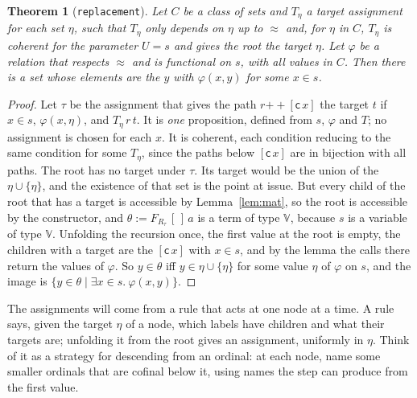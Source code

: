 \documentclass[10pt]{article}
\newtheorem{theorem}{Theorem}[section]
\theoremstyle{definition}
\theoremstyle{remark}
\newcommand{\V}{\mathbb{V}}
\newcommand{\lc}{\mathsf{c}}
\newcommand{\lean}[1]{\texttt{#1}}
\begin{document}
\begin{theorem}[\lean{replacement}]\label{thm:repl}
Let $C$ be a class of sets and $T_\eta$ a target assignment for each set
$\eta$, such that $T_\eta$ only depends on $\eta$ up to $\approx$ and, for $\eta$ in $C$,
$T_\eta$ is coherent for the parameter $U=s$ and gives the root the
target $\eta$. Let $\varphi$ be a relation that respects $\approx$ and is functional
on $s$, with all values in $C$. Then there is a set whose elements are
the $y$ with $\varphi(x,y)$ for some $x\in s$.
\end{theorem}
\begin{proof}
Let $\tau$ be the assignment that gives the path $r\mathbin{+\!\!+}[\lc\,x]$ the
target $t$ if $x\in s$, $\varphi(x,\eta)$, and $T_\eta\,r\,t$. It is \emph{one}
proposition, defined from $s$, $\varphi$ and $T$; no assignment is chosen for
each $x$. It is coherent, each condition reducing to the same condition
for some $T_\eta$, since the paths below $[\lc\,x]$ are in bijection with all
paths. The root has no target under $\tau$. Its target would be the union
of the $\eta\cup\{\eta\}$, and the existence of that set is the point at
issue. But every child of the root that has a target is accessible by
Lemma~\ref{lem:mat}, so the root is accessible by the constructor, and
$\theta:=F_{R_\tau}\,[\,]\,a$ is a term of type $\V$, because $s$ is a
variable of type $\V$. Unfolding the recursion once, the first value at
the root is empty, the children with a target are the $[\lc\,x]$ with
$x\in s$, and by the lemma the calls there return the values of $\varphi$. So
$y\in\theta$ iff $y\in\eta\cup\{\eta\}$ for some value $\eta$ of $\varphi$ on $s$, and the image is
$\{y\in\theta\mid\exists x\in s.\ \varphi(x,y)\}$.
\end{proof}

The assignments will come from a rule that acts at one node at a time.
A rule says, given the target $\eta$ of a node, which labels have children
and what their targets are; unfolding it from the root gives an
assignment, uniformly in $\eta$. Think of it as a strategy for descending
from an ordinal: at each node, name some smaller ordinals that are
cofinal below it, using names the step can produce from the first
value.
\end{document}
